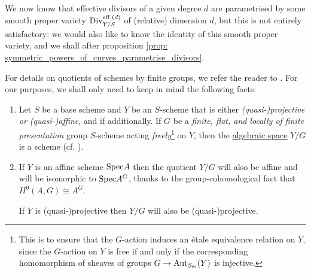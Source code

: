                 We now know that effective divisors of a given degree $d$ are parametrised by some smooth proper variety $\mathrm{Div}_{Y/S}^{\mathrm{eff}, (d)}$ of (relative) dimension $d$, but this is not entirely satisfactory: we would also like to know the identity of this smooth proper variety, and we shall after proposition \ref{prop: symmetric_powers_of_curves_parametrise_divisors}.
                \begin{remark} \label{remark: quotients_of_schemes_by_finite_group_schemes}
                    For details on quotients of schemes by finite groups, we refer the reader to \cite[Expos\'e V]{SGA1}. For our purposes, we shall only need to keep in mind the following facts: 
                        \begin{enumerate}
                            \item Let $S$ be a base scheme and $Y$ be an $S$-scheme that is either \textit{(quasi-)projective or (quasi-)affine}, and if additionally. If $G$ be a \textit{finite, flat, and locally of finite presentation} group $S$-scheme acting \textit{freely}\footnote{This is to ensure that the $G$-action induces an \'etale equivalence relation on $Y$, since the $G$-action on $Y$ is free if and only if the corresponding homomorphism of sheaves of groups $G \to \mathrm{Aut}_{S_{\mathrm{\acute{e}t}}}(Y)$ is injective.} on $Y$, then the \href{https://stacks.math.columbia.edu/tag/025X}{\underline{algebraic space}} $Y/G$ is a scheme (cf. \cite[\href{https://stacks.math.columbia.edu/tag/07S7}{Tag 07S7}]{stacks}). 
                            \item If $Y$ is an affine scheme $\mathrm{Spec} A$ then the quotient $Y/G$ will also be affine and will be isomorphic to $\mathrm{Spec} A^G$, thanks to the group-cohomological fact that $H^0(A, G) \cong A^G$. 
                            
                            If $Y$ is (quasi-)projective then $Y/G$ will also be (quasi-)projective.
                        \end{enumerate}
                \end{remark}
                

